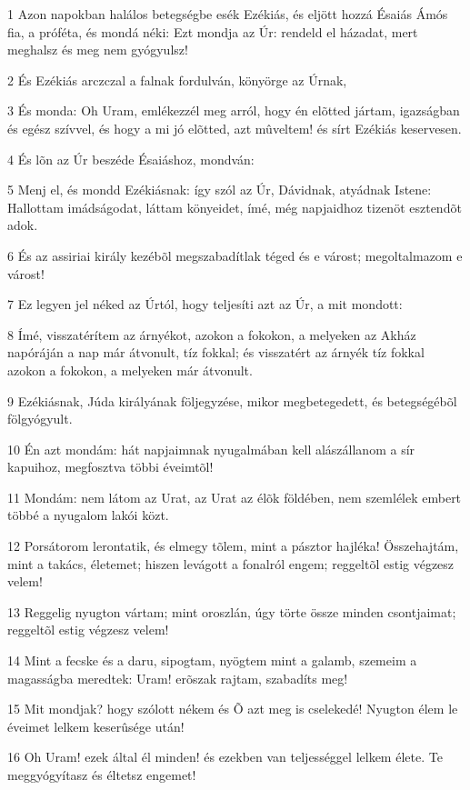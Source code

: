 \par 1 Azon napokban halálos betegségbe esék Ezékiás, és eljött hozzá Ésaiás Ámós fia, a próféta, és mondá néki: Ezt mondja az Úr: rendeld el házadat, mert meghalsz és meg nem gyógyulsz!
\par 2 És Ezékiás arczczal a falnak fordulván, könyörge az Úrnak,
\par 3 És monda: Oh Uram, emlékezzél meg arról, hogy én elõtted jártam, igazságban és egész szívvel, és hogy a mi jó elõtted, azt mûveltem! és sírt Ezékiás keservesen.
\par 4 És lõn az Úr beszéde Ésaiáshoz, mondván:
\par 5 Menj el, és mondd Ezékiásnak: így szól az Úr, Dávidnak, atyádnak Istene: Hallottam imádságodat, láttam könyeidet, ímé, még napjaidhoz tizenöt esztendõt adok.
\par 6 És az assiriai király kezébõl megszabadítlak téged és e várost; megoltalmazom e várost!
\par 7 Ez legyen jel néked az Úrtól, hogy teljesíti azt az Úr, a mit mondott:
\par 8 Ímé, visszatérítem az árnyékot, azokon a fokokon, a melyeken az Akház napóráján a nap már átvonult, tíz fokkal; és visszatért az árnyék tíz fokkal azokon a fokokon, a melyeken már átvonult.
\par 9 Ezékiásnak, Júda királyának följegyzése, mikor megbetegedett, és betegségébõl fölgyógyult.
\par 10 Én azt mondám: hát napjaimnak nyugalmában kell alászállanom a sír kapuihoz, megfosztva többi éveimtõl!
\par 11 Mondám: nem látom az Urat, az Urat az élõk földében, nem szemlélek embert többé a nyugalom lakói közt.
\par 12 Porsátorom lerontatik, és elmegy tõlem, mint a pásztor hajléka! Összehajtám, mint a takács, életemet; hiszen levágott a fonalról engem; reggeltõl estig végzesz velem!
\par 13 Reggelig nyugton vártam; mint oroszlán, úgy törte össze minden csontjaimat; reggeltõl estig végzesz velem!
\par 14 Mint a fecske és a daru, sipogtam, nyögtem mint a galamb, szemeim a magasságba meredtek: Uram! erõszak rajtam, szabadíts meg!
\par 15 Mit mondjak? hogy szólott nékem és Õ azt meg is cselekedé! Nyugton élem le éveimet lelkem keserûsége után!
\par 16 Oh Uram! ezek által él minden! és ezekben van teljességgel lelkem élete. Te meggyógyítasz és éltetsz engemet!
